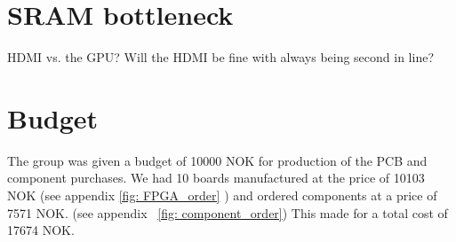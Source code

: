 \documentclass[../main/report.tex]{subfiles}
\begin{document}
\section{SRAM bottleneck}
HDMI vs. the GPU?
Will the HDMI be fine with always being second in line?

\section{Budget}
The group was given a budget of 10000 NOK for production of the PCB and component purchases. 
We had 10 boards manufactured at the price of 10103 NOK (see appendix \ref{fig: FPGA_order} ) and ordered components at a price of 7571 NOK. (see appendix ~\ref{fig: component_order}) 
This made for a total cost of 17674 NOK.
\end{document}

